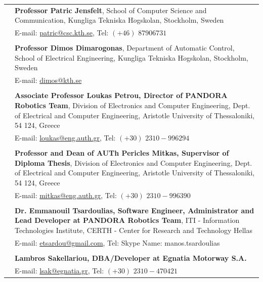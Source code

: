 \documentclass[a4paper,10pt,twoside]{article}
\begin{document}
\begin{tabular}{rp{14cm}}
& \textbf{Professor Patric Jensfelt},
School of Computer Science and Communication, Kungliga Tekniska H$\ddot{o}$gskolan, Stockholm, Sweden \\
& E-mail: \href{mailto: patric@csc.kth.se}{patric@csc.kth.se}, Tel: $(+46)$ $8 790 67 31$ \\
&\\
& \textbf{Professor Dimos Dimarogonas},
Department of Automatic Control, School of Electrical Engineering, Kungliga Tekniska H$\ddot{o}$gskolan, Stockholm, Sweden \\
& E-mail: \href{mailto: dimos@kth.se}{dimos@kth.se} \\
&\\
& \textbf{Associate Professor Loukas Petrou, Director of PANDORA Robotics Team},
Division of Electronics and Computer Engineering, Dept. of
Electrical and Computer Engineering, Aristotle University of Thessaloniki, 54 124, Greece \\
& E-mail: \href{mailto: loukas@eng.auth.gr}{loukas@eng.auth.gr}, Tel: $(+30)$ $2310-996294$ \\
&\\
& \textbf{Professor and Dean of AUTh Pericles Mitkas, Supervisor of Diploma Thesis},
Division of Electronics and Computer Engineering, Dept. of
Electrical and Computer Engineering, Aristotle University of Thessaloniki, 54 124, Greece \\
& E-mail: \href{mailto:mitkas@eng.auth.gr}{mitkas@eng.auth.gr}, Tel: $(+30)$ $2310-996390$ \\
&\\
& \textbf{Dr. Emmanouil Tsardoulias, Software Engineer, Administrator and Lead Developer at PANDORA Robotics Team}, ITI - Information Technologies Institute, CERTH
- Center for Research and Technology Hellas \\
& E-mail: \href{mailto:etsardou@gmail.com}{etsardou@gmail.com}, Tel: Skype Name: manos.tsardoulias \\
&\\
& \textbf{Lambros Sakellariou, DBA/Developer at Egnatia Motorway S.A.}\\
& E-mail: \href{mailto:lsak@egnatia.gr}{lsak@egnatia.gr}, Tel: $(+30)$ $2310 - 470421$ \\

\end{tabular}
\end{document}
